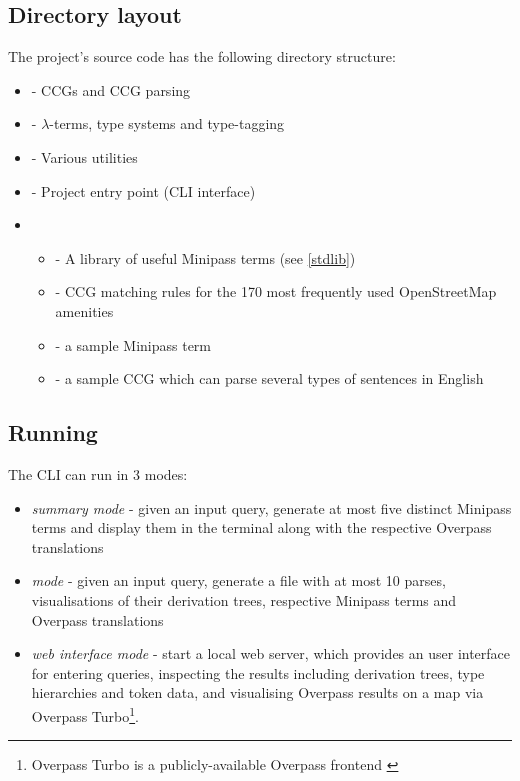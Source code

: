 \documentclass[main.tex]{subfiles}
\begin{document}
\subsection{Directory layout}

The project's source code has the following directory structure:
\begin{itemize}
    \item {} - CCGs and CCG parsing
    \item {} - $\lambda$-terms, type systems and type-tagging
    \item {} - Various utilities
    \item {} - Project entry point (CLI interface)
    \item {}
        \begin{itemize}
            \item {} - A library of useful Minipass terms
                (see \cref{stdlib})
            \item {} - CCG matching rules for the 170 most
                frequently used OpenStreetMap amenities
            \item {} - a sample Minipass term
            \item {} - a sample CCG which can parse several
                types of sentences in English
        \end{itemize}
\end{itemize}

\subsection{Running}
The CLI can run in 3 modes:
\begin{itemize}
    \item \emph{summary mode} - given an input query, generate at most five
        distinct Minipass terms and display them in the terminal along with
        the respective Overpass translations
    \item \emph{\latex mode} - given an input query, generate a 
        file with at most 10 parses, visualisations of their derivation trees,
        respective Minipass terms and Overpass translations
    \item \emph{web interface mode} - start a local web server, which provides
        an user interface for entering queries, inspecting the results including
        derivation trees, type hierarchies and token data, and visualising
        Overpass results on a map via Overpass Turbo\footnote{
            Overpass Turbo is a publicly-available Overpass frontend \cite{overpassturbo}
        }.
\end{itemize}
\end{document}
